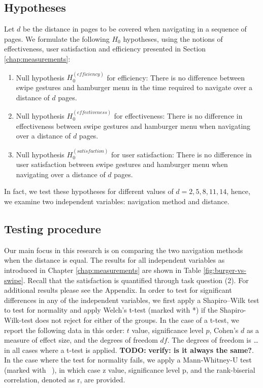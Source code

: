 \documentclass{sig-alternate-05-2015}
\newcommand{\todo}{\textbf{TODO:} \textbf}
\begin{document}
\subsection{Hypotheses}
Let $d$ be the distance in pages to be covered when navigating in a sequence of pages. We formulate the following $H_0$ hypotheses, using the notions
of effectiveness, user satisfaction and efficiency presented in Section \ref{chap:measurements}:
\begin{enumerate}
	\item Null hypothesis $H_0^{(efficiency)}$ for efficiency:
	There is no difference between swipe gestures and hamburger menu in the
	time required to navigate over a distance of $d$ pages.
	\item Null hypothesis $H_0^{(effectiveness)}$ for effectiveness: There is no
	difference in effectiveness between swipe gestures and hamburger menu
	when navigating over a distance of $d$ pages.
	\item Null hypothesis $H_0^{(satisfaction)}$ for user satisfaction: There is no
	difference in user satisfaction between swipe gestures and hamburger menu
	when navigating over a distance of $d$ pages.
\end{enumerate}

In fact, we test these hypotheses for different values of $d = 2, 5, 8, 11, 14$, hence, we
examine two independent variables: navigation method and distance.

\subsection{Testing procedure}
Our main focus in this research is on comparing the two navigation methods when the distance is equal.
The results for all independent variables as introduced in Chapter \ref{chap:measurements} are shown in Table \ref{fig:burger-vs-swipe}. Recall that the
satisfaction is quantified through task question (2). For additional results please see the Appendix.
In order to test for significant differences in any of the independent variables, we first apply a Shapiro–Wilk test to 
test for normality and apply Welch's t-test (marked with *) if the Shapiro-Wilk-test does not reject for either of the groups.
In the case of a t-test, we report the following data in this order: $t$ value, significance level $p$, Cohen's $d$ as a measure of effect size, and the degrees of
freedom $df$. 
The degrees of freedom is \ldots in all cases where a t-test is applied. \todo{verify: is it always the same?}.
In the case where the test for normality fails, we apply a Mann-Whitney-U test (marked with ~), in which case z value, significance level p, and 
the rank-biserial correlation, denoted as r, are provided.
\end{document}

